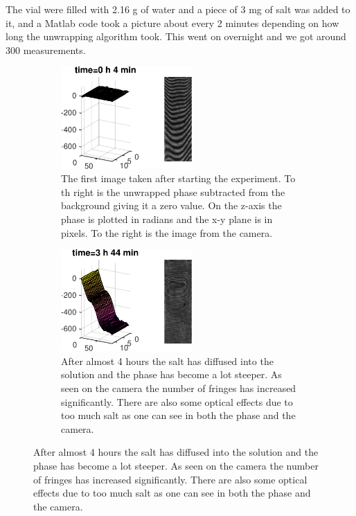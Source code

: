 The vial were filled with 2.16 g of water and a piece of 3 mg of salt was added to it,
and a Matlab code took a picture about every 2 minutes depending on how long the 
unwrapping algorithm took. This went on overnight and we got around 300 measurements.
\begin {figure}[ht!]
\begin {subfigure}[h]{0.35\textwidth}
\includegraphics [width=5cm]{bilder/diff2.pdf}
\caption {The first image taken after starting the experiment. To th right is the
unwrapped phase subtracted from the background giving it a zero value. On the z-axis
the phase is plotted in radians and the x-y plane is in pixels. To the right
is the image from the camera.}
\end {subfigure}
\hfill
\begin {subfigure}[h]{0.35\textwidth}
\includegraphics [width=5cm]{bilder/diff102.pdf}
\caption {After almost 4 hours the salt has diffused into the solution and the phase
has become a lot steeper. As seen on the camera the number of fringes has increased
significantly. There are also some optical effects due to too much salt as one can
see in both the phase and the camera.}
\end {subfigure}


\end{figure}
